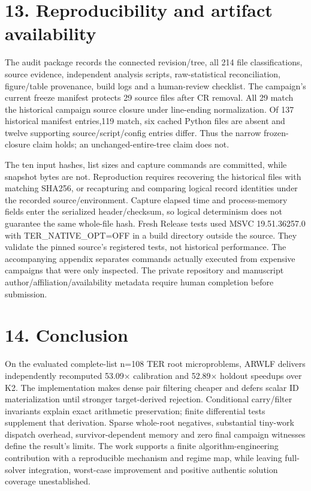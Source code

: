 \documentclass[10pt,letterpaper]{article}
\begin{document}
\section*{13. Reproducibility and artifact availability}

The audit package records the connected revision/tree, all 214 file classifications, source evidence, independent analysis scripts, raw-statistical reconciliation, figure/table provenance, build logs and a human-review checklist. The campaign's current freeze manifest protects 29 source files after CR removal. All 29 match the historical campaign source closure under line-ending normalization. Of 137 historical manifest entries,119 match, six cached Python files are absent and twelve supporting source/script/config entries differ. Thus the narrow frozen-closure claim holds; an unchanged-entire-tree claim does not.


The ten input hashes, list sizes and capture commands are committed, while snapshot bytes are not. Reproduction requires recovering the historical files with matching SHA256, or recapturing and comparing logical record identities under the recorded source/environment. Capture elapsed time and process-memory fields enter the serialized header/checksum, so logical determinism does not guarantee the same whole-file hash. Fresh Release tests used MSVC 19.51.36257.0 with TER\_NATIVE\_OPT=OFF in a build directory outside the source. They validate the pinned source's registered tests, not historical performance. The accompanying appendix separates commands actually executed from expensive campaigns that were only inspected. The private repository and manuscript author/affiliation/availability metadata require human completion before submission.


\section*{14. Conclusion}

On the evaluated complete-list n=108 TER root microproblems, ARWLF delivers independently recomputed 53.09\ensuremath{\times} calibration and 52.89\ensuremath{\times} holdout speedups over K2. The implementation makes dense pair filtering cheaper and defers scalar ID materialization until stronger target-derived rejection. Conditional carry/filter invariants explain exact arithmetic preservation; finite differential tests supplement that derivation. Sparse whole-root negatives, substantial tiny-work dispatch overhead, survivor-dependent memory and zero final campaign witnesses define the result's limits. The work supports a finite algorithm-engineering contribution with a reproducible mechanism and regime map, while leaving full-solver integration, worst-case improvement and positive authentic solution coverage unestablished.
\end{document}
